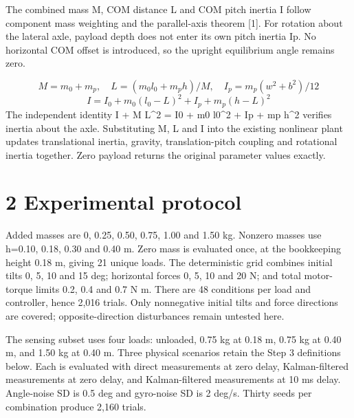 \documentclass[11pt,a4paper]{article}
\begin{document}
The combined mass M, COM distance L and COM pitch inertia I follow component mass weighting and the parallel-axis theorem [1]. For rotation about the lateral axle, payload depth does not enter its own pitch inertia Ip. No horizontal COM offset is introduced, so the upright equilibrium angle remains zero.

\begin{equation}M=m_0+m_p,\quad L=(m_0l_0+m_ph)/M,\quad I_p=m_p(w^2+b^2)/12\end{equation}
\begin{equation}I=I_0+m_0(l_0-L)^2+I_p+m_p(h-L)^2\end{equation}
The independent identity I + M L\textasciicircum{}2 = I0 + m0 l0\textasciicircum{}2 + Ip + mp h\textasciicircum{}2 verifies inertia about the axle. Substituting M, L and I into the existing nonlinear plant updates translational inertia, gravity, translation-pitch coupling and rotational inertia together. Zero payload returns the original parameter values exactly.

\clearpage
\section*{2 Experimental protocol}
Added masses are 0, 0.25, 0.50, 0.75, 1.00 and 1.50 kg. Nonzero masses use h=0.10, 0.18, 0.30 and 0.40 m. Zero mass is evaluated once, at the bookkeeping height 0.18 m, giving 21 unique loads. The deterministic grid combines initial tilts 0, 5, 10 and 15 deg; horizontal forces 0, 5, 10 and 20 N; and total motor-torque limits 0.2, 0.4 and 0.7 N m. There are 48 conditions per load and controller, hence 2,016 trials. Only nonnegative initial tilts and force directions are covered; opposite-direction disturbances remain untested here.

The sensing subset uses four loads: unloaded, 0.75 kg at 0.18 m, 0.75 kg at 0.40 m, and 1.50 kg at 0.40 m. Three physical scenarios retain the Step 3 definitions below. Each is evaluated with direct measurements at zero delay, Kalman-filtered measurements at zero delay, and Kalman-filtered measurements at 10 ms delay. Angle-noise SD is 0.5 deg and gyro-noise SD is 2 deg/s. Thirty seeds per combination produce 2,160 trials.
\end{document}
